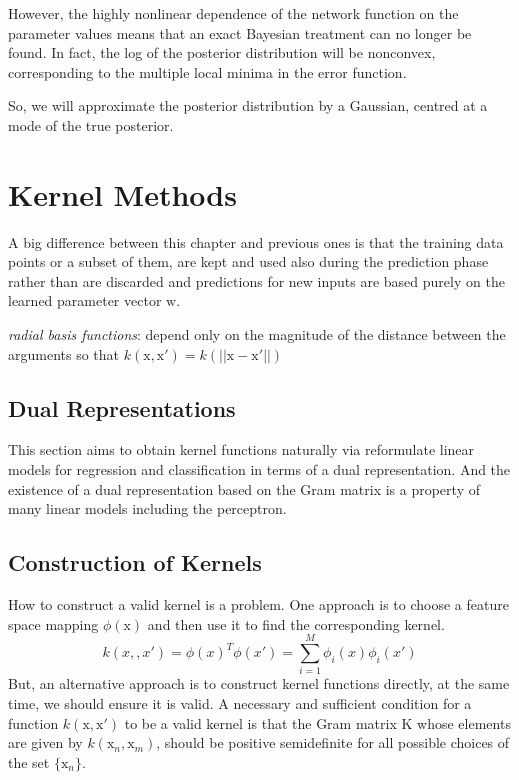 \documentclass[a4paper]{book}
\begin{document}
However, the highly nonlinear dependence of the network function on the parameter values means
that an exact Bayesian treatment can no longer be found. In fact, the log of the posterior distribution will be nonconvex, corresponding to the multiple local minima in the error function.

So, we will approximate the posterior distribution by a Gaussian, centred at a mode of the true posterior.

\section{Kernel Methods}
A big difference between this chapter and previous ones is that the training data points or a subset of them, are kept and used also during the prediction phase rather than are discarded and predictions for new inputs are based purely on the learned parameter vector $\mathrm w$.

\textit{radial basis functions}: depend only on the magnitude of the distance  between the arguments so that $k(\mathrm x,\mathrm x') = k(||\mathrm x-\mathrm x'||)$
\subsection{Dual Representations}
This section aims to obtain kernel functions naturally via reformulate linear models for regression and classification in terms of a dual representation.  And the existence of a dual representation based on the Gram matrix is a property of many linear models including the perceptron.
\subsection{ Construction of Kernels}
How to construct a valid kernel is a problem. One approach is to choose a feature space mapping $\phi(\mathrm x)$ and then use it to find the corresponding  kernel.
\begin{equation}
  k(x, ,x') = \phi(x)^T\phi(x') = \sum_{i=1}^M\phi_i(x)\phi_i(x')
\end{equation}
But, an alternative approach is to construct kernel functions directly, at the same time, we should ensure it is valid.  A necessary and sufficient condition for a function $k(\mathrm x, \mathrm  x') $ to be a valid kernel is that the Gram matrix $\mathrm  K$ whose elements are given by $k(\mathrm  x_n,\mathrm  x_m)$, should be positive semidefinite for all possible choices of the set $\{\mathrm  x_n\}$.
\end{document}

